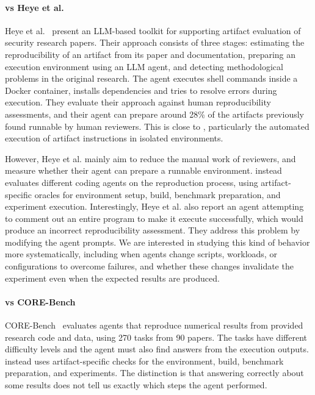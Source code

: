 \paragraph{\aebench vs Heye et al.}
Heye et al.~\cite{heye-bigdata25} present an LLM-based toolkit for supporting
  artifact evaluation of security research papers.
Their approach consists of three stages: estimating the reproducibility of
  an artifact from its paper and documentation, preparing an execution
  environment using an LLM agent, and detecting methodological problems
  in the original research.
The agent executes shell commands inside a Docker container, installs
  dependencies and tries to resolve errors during execution.
They evaluate their approach against human reproducibility assessments,
  and their agent can prepare around 28\% of the artifacts previously
  found runnable by human reviewers.
This is close to \aebench, particularly the automated execution of
  artifact instructions in isolated environments.

However, Heye et al. mainly aim to reduce the manual work of reviewers,
  and measure whether their agent can prepare a runnable environment.
\aebench instead evaluates different coding agents on the reproduction
  process, using artifact-specific oracles for environment setup, build,
  benchmark preparation, and experiment execution.
Interestingly, Heye et al. also report an agent attempting to comment out
  an entire program to make it execute successfully, which would produce
  an incorrect reproducibility assessment.
They address this problem by modifying the agent prompts.
We are interested in studying this kind of behavior more systematically,
  including when agents change scripts, workloads, or configurations
  to overcome failures, and whether these changes invalidate the
  experiment even when the expected results are produced.

\paragraph{\aebench vs CORE-Bench}
CORE-Bench~\cite{siegel-tmlr25} evaluates agents that reproduce numerical results from
  provided research code and data, using 270 tasks from 90 papers.
The tasks have different difficulty levels and the agent must also find answers from
  the execution outputs.
\aebench instead uses artifact-specific checks for the environment, build, benchmark
  preparation, and experiments.
The distinction is that answering correctly about some results does not tell us
  exactly which steps the agent performed.

